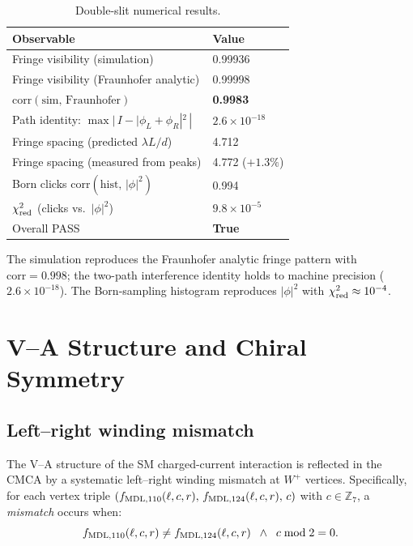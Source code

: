 \documentclass[11pt]{article}
\theoremstyle{remark}
\newcommand{\ZS}{\mathbb{Z}_7}
\begin{document}
\begin{table}[h]
  \centering
  \small
  \caption{Double-slit numerical results.}
  \label{tab:dslit}
  \begin{tabular}{ll}
    \toprule
    Observable & Value \\
    \midrule
    Fringe visibility (simulation) & 0.99936 \\
    Fringe visibility (Fraunhofer analytic) & 0.99998 \\
    $\mathrm{corr}(\text{sim},\,\text{Fraunhofer})$ & \textbf{0.9983} \\
    Path identity: $\max|\,I - |\phi_L+\phi_R|^2\,|$ & $2.6\times10^{-18}$ \\
    Fringe spacing (predicted $\lambda L/d$) & 4.712 \\
    Fringe spacing (measured from peaks) & 4.772 ($+1.3\%$) \\
    Born clicks $\mathrm{corr}(\text{hist},\,|\phi|^2)$ & 0.994 \\
    $\chi^2_{\rm red}$ (clicks vs.\ $|\phi|^2$) & $9.8\times10^{-5}$ \\
    Overall PASS & \textbf{True} \\
    \bottomrule
  \end{tabular}
\end{table}

The simulation reproduces the Fraunhofer analytic fringe pattern with
$\mathrm{corr}=0.998$; the two-path interference identity holds to
machine precision ($2.6\times10^{-18}$).  The Born-sampling histogram
reproduces $|\phi|^2$ with $\chi^2_{\rm red}\approx10^{-4}$.

\section{V--A Structure and Chiral Symmetry}
\label{sec:va}

\subsection{Left--right winding mismatch}
\label{ssec:mismatch}

The V--A structure of the SM charged-current interaction is reflected in
the CMCA by a systematic left--right winding mismatch at $W^+$
vertices.  Specifically, for each vertex triple $(f_{\rm MDL,110}(\ell,c,r),\,
f_{\rm MDL,124}(\ell,c,r),\,c)$ with $c\in\ZS$, a \emph{mismatch} occurs
when:
\begin{equation}
  f_{\rm MDL,110}(\ell,c,r) \neq f_{\rm MDL,124}(\ell,c,r)
  \;\;\wedge\;\; c \bmod 2 = 0.
\end{equation}
\end{document}
